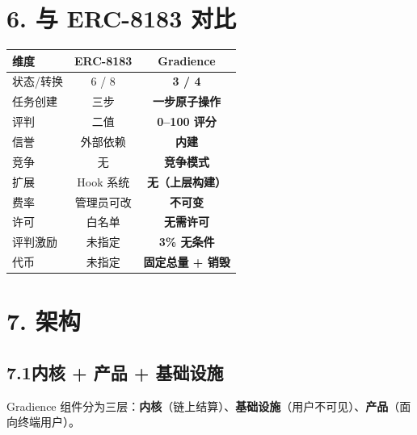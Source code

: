 \documentclass[11pt,a4paper]{article}
\begin{document}
\section{6. 与 ERC-8183 对比}

\begin{table}[H]\centering\small
\begin{tabular}{@{}lcc@{}}
\toprule
\textbf{维度} & \textbf{ERC-8183} & \textbf{Gradience} \\
\midrule
状态/转换 & 6 / 8 & \textbf{3 / 4} \\
任务创建 & 三步 & \textbf{一步原子操作} \\
评判 & 二值 & \textbf{0--100 评分} \\
信誉 & 外部依赖 & \textbf{内建} \\
竞争 & 无 & \textbf{竞争模式} \\
扩展 & Hook 系统 & \textbf{无（上层构建）} \\
费率 & 管理员可改 & \textbf{不可变} \\
许可 & 白名单 & \textbf{无需许可} \\
评判激励 & 未指定 & \textbf{3\% 无条件} \\
代币 & 未指定 & \textbf{固定总量 + 销毁} \\
\bottomrule
\end{tabular}
\end{table}

\section{7. 架构}

\subsection{7.1\quad 内核 + 产品 + 基础设施}

Gradience 组件分为三层：\textbf{内核}（链上结算）、\textbf{基础设施}（用户不可见）、\textbf{产品}（面向终端用户）。
\end{document}

